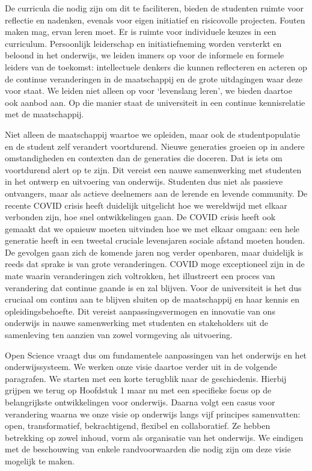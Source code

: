 \documentclass[empirical, authordate, ]{new-jote-article}
\begin{document}
	De curricula die nodig zijn om dit te faciliteren, bieden de studenten ruimte voor reflectie en nadenken, evenals voor eigen initiatief en risicovolle projecten. Fouten maken mag, ervan leren moet. Er is ruimte voor individuele keuzes in een curriculum. Persoonlijk leiderschap en initiatiefneming worden versterkt en beloond in het onderwijs, we leiden immers op voor de informele en formele leiders van de toekomst: intellectuele denkers die kunnen reflecteren en acteren op de continue veranderingen in de maatschappij en de grote uitdagingen waar deze voor staat. We leiden niet alleen op voor ‘levenslang leren', we bieden daartoe ook aanbod aan. Op die manier staat de universiteit in een continue kennisrelatie met de maatschappij.



	Niet alleen de maatschappij waartoe we opleiden, maar ook de studentpopulatie en de student zelf verandert voortdurend. Nieuwe generaties groeien op in andere omstandigheden en contexten dan de generaties die doceren. Dat is iets om voortdurend alert op te zijn. Dit vereist een nauwe samenwerking met studenten in het ontwerp en uitvoering van onderwijs. Studenten dus niet als passieve ontvangers, maar als actieve deelnemers aan de lerende en levende community. De recente COVID crisis heeft duidelijk uitgelicht hoe we wereldwijd met elkaar verbonden zijn, hoe snel ontwikkelingen gaan. De COVID crisis heeft ook gemaakt dat we opnieuw moeten uitvinden hoe we met elkaar omgaan: een hele generatie heeft in een tweetal cruciale levensjaren sociale afstand moeten houden. De gevolgen gaan zich de komende jaren nog verder openbaren, maar duidelijk is reeds dat sprake is van grote veranderingen. COVID moge exceptioneel zijn in de mate waarin veranderingen zich voltrokken, het illustreert een proces van verandering dat continue gaande is en zal blijven. Voor de universiteit is het dus cruciaal om continu aan te blijven sluiten op de maatschappij en haar kennis en opleidingsbehoefte. Dit vereist aanpassingsvermogen en innovatie van ons onderwijs in nauwe samenwerking met studenten en stakeholders uit de samenleving ten aanzien van zowel vormgeving als uitvoering.



	Open Science vraagt dus om fundamentele aanpassingen van het onderwijs en het onderwijssysteem. We werken onze visie daartoe verder uit in de volgende paragrafen. We starten met een korte terugblik naar de geschiedenis. Hierbij grijpen we terug op Hoofdstuk 1 maar nu met een specifieke focus op de belangrijkste ontwikkelingen voor onderwijs. Daarna volgt een casus voor verandering waarna we onze visie op onderwijs langs vijf principes samenvatten: open, transformatief, bekrachtigend, flexibel en collaboratief. Ze hebben betrekking op zowel inhoud, vorm als organisatie van het onderwijs. We eindigen met de beschouwing van enkele randvoorwaarden die nodig zijn om deze visie mogelijk te maken.
\end{document}
